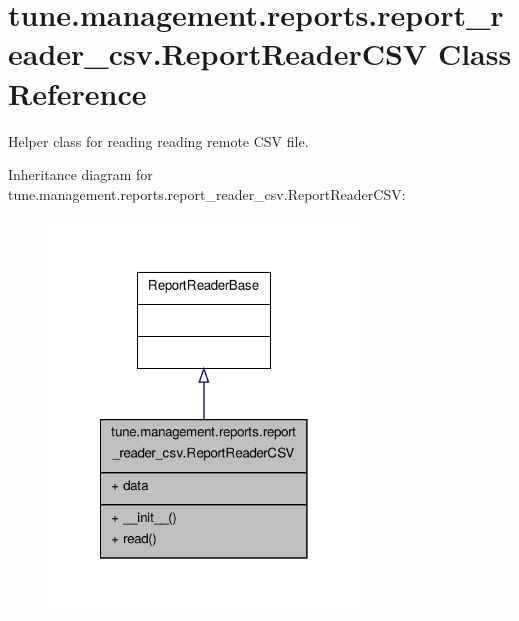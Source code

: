 \hypertarget{classtune_1_1management_1_1reports_1_1report__reader__csv_1_1ReportReaderCSV}{\section{tune.\-management.\-reports.\-report\-\_\-reader\-\_\-csv.\-Report\-Reader\-C\-S\-V Class Reference}
\label{classtune_1_1management_1_1reports_1_1report__reader__csv_1_1ReportReaderCSV}
}


Helper class for reading reading remote C\-S\-V file.  




Inheritance diagram for tune.\-management.\-reports.\-report\-\_\-reader\-\_\-csv.\-Report\-Reader\-C\-S\-V\-:
\nopagebreak
\begin{figure}[H]
\begin{center}
\leavevmode
\includegraphics[width=234pt]{classtune_1_1management_1_1reports_1_1report__reader__csv_1_1ReportReaderCSV__inherit__graph}
\end{center}
\end{figure}


